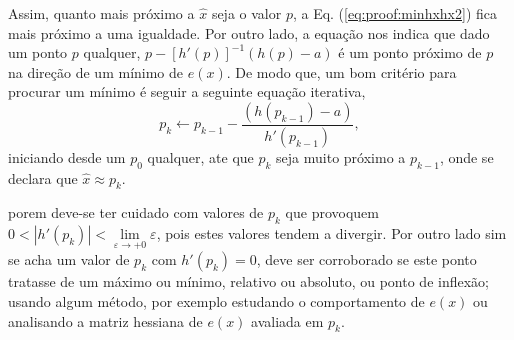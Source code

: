 \begin{myproofT}
Assim, quanto mais próximo a $\hat{x}$ seja  o valor $p$, 
a Eq. (\ref{eq:proof:minhxhx2}) fica mais próximo a uma igualdade. Por outro lado,
a equação nos indica que dado um ponto  $p$ qualquer,
$p - \left[ h'(p) \right]^{-1}\left(h(p)-a\right)$
é um ponto próximo de $p$  na direção de um mínimo de $e(x)$.
De modo que, um bom critério para procurar um mínimo é seguir a seguinte 
equação iterativa,
\begin{equation}\label{eq:proof:minhxhx3}
p_{k} \leftarrow p_{k-1} - \frac{ \left(h(p_{k-1})-a\right)}{h'(p_{k-1})},
\end{equation}
iniciando desde um $p_{0}$ qualquer, ate que $p_{k}$ seja muito próximo a $p_{k-1}$,
onde se declara que $\hat{x} \approx p_{k}$. 


porem deve-se ter cuidado com valores de $p_{k}$ que provoquem 
$0<|h'(p_{k})|<\lim\limits_{\varepsilon \rightarrow +0}\varepsilon$,
pois estes valores tendem a divergir. Por outro lado sim se acha um valor 
de $p_{k}$ com $h'(p_{k})= 0$, deve ser
corroborado se este ponto tratasse de um máximo ou mínimo, relativo ou absoluto, ou ponto de inflexão;
usando algum método, por exemplo estudando o comportamento 
de $e(x)$ ou analisando a matriz hessiana de $e(x)$ avaliada em $p_{k}$.

\end{myproofT}





